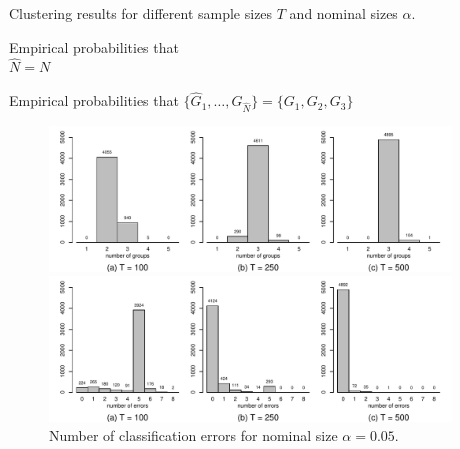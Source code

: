 \documentclass[12pt]{article}
\begin{document}
\addtocounter{table}{-1} 
\begin{table}[t]
\footnotesize{
\begin{center}
\caption{Clustering results for different sample sizes $T$ and nominal sizes $\alpha$.}\label{tab:clustering}
\begin{subtable}[b]{0.48\textwidth}
\centering
\caption{Empirical probabilities that \\ $\widehat{N} = N$}\label{tab:clustering:1}
\renewcommand{\arraystretch}{1.2}

\end{subtable}
\begin{subtable}[b]{0.48\textwidth}
\centering
\caption{\centering Empirical probabilities that $\{ \widehat{G}_1,\ldots,\widehat{G}_{\widehat{N}}\} = \{ G_1,G_2,G_3\}$}\label{tab:clustering:2}
\renewcommand{\arraystretch}{1.2}

\end{subtable}
\end{center}}
\vspace{-0.5cm}
\end{table}


\begin{figure}[t!]
\centering
\includegraphics[width=0.95\textwidth]{output/plots/sim/histograms_groups}
\caption{Estimated number of groups $\widehat{N}$ for nominal size $\alpha = 0.05$. 
}\label{fig:clustering:1}
\vspace{0.25cm}

\includegraphics[width=0.95\textwidth]{output/plots/sim/histograms_errors}
\caption{Number of classification errors for nominal size $\alpha = 0.05$. 
}\label{fig:clustering:2}
\end{figure}
\end{document}

